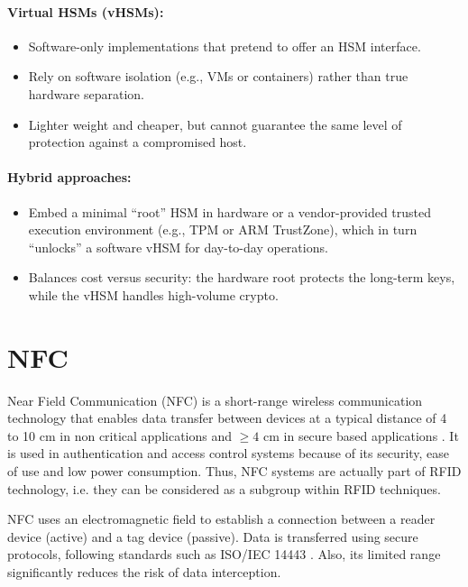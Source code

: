 \paragraph{Virtual HSMs (vHSMs):}
\begin{itemize}
	\item Software-only implementations that pretend to offer an HSM interface.
	\item Rely on software isolation (e.g., VMs or containers) rather than true hardware separation.
	\item Lighter weight and cheaper, but cannot guarantee the same level of protection against a compromised host.
\end{itemize}

\paragraph{Hybrid approaches:}
\begin{itemize}
	\item Embed a minimal “root” HSM in hardware or a vendor-provided trusted execution environment (e.g., TPM or ARM TrustZone), which in turn “unlocks” a software vHSM for day-to-day operations.
	\item Balances cost versus security: the hardware root protects the long-term keys, while the vHSM handles high-volume crypto.
\end{itemize}

\section{NFC}
\label{sec:nfc}

Near Field Communication (NFC) is a short-range wireless communication technology that enables data transfer between devices at a typical distance of 4 to 10 cm in non critical applications \cite{ref63} and $\geq 4$ cm in secure based applications \cite{ref64}. It is used in authentication and access control systems because of its security, ease of use and low power consumption. Thus, NFC systems are actually part of RFID technology, i.e. they can be considered as a subgroup within RFID techniques.

NFC uses an electromagnetic field to establish a connection between a reader device (active) and a tag device (passive). Data is transferred using secure protocols, following standards such as ISO/IEC 14443 \cite{Ref2}. Also, its limited range significantly reduces the risk of data interception.

